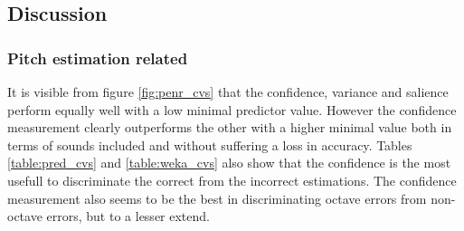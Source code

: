 \documentclass{proc}
\begin{document}
\subsection{Discussion}
\subsubsection{Pitch estimation related}
It is visible from figure \ref{fig:penr_cvs}  that the confidence, variance and salience perform equally well with a low minimal predictor value. However the confidence measurement clearly outperforms the other with a higher minimal value both in terms of sounds included and without suffering a loss in accuracy. Tables \ref{table:pred_cvs} and \ref{table:weka_cvs} also show that the confidence is the most usefull to discriminate the correct from the incorrect estimations. 
The confidence measurement also seems to be the best in discriminating octave errors from non-octave errors, but to a lesser extend.
\end{document}
